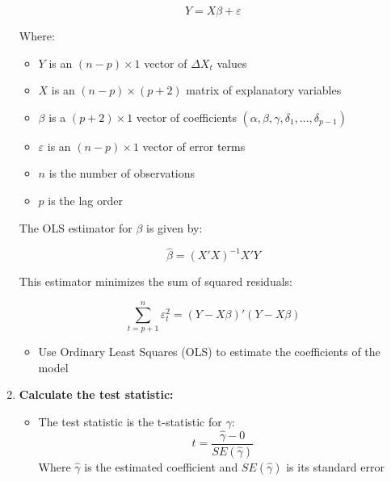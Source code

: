 \documentclass{article}
\begin{document}
\begin{definition}
\begin{enumerate}
        \begin{equation}
        Y = X\beta + \varepsilon
        \end{equation}

        Where:
        \begin{itemize}
            \item $Y$ is an $(n-p) \times 1$ vector of $\Delta X_t$ values
            \item $X$ is an $(n-p) \times (p+2)$ matrix of explanatory variables
            \item $\beta$ is a $(p+2) \times 1$ vector of coefficients $(\alpha, \beta, \gamma, \delta_1, \ldots, \delta_{p-1})$
            \item $\varepsilon$ is an $(n-p) \times 1$ vector of error terms
            \item $n$ is the number of observations
            \item $p$ is the lag order
        \end{itemize}

        The OLS estimator for $\beta$ is given by:

        \begin{equation}
        \hat{\beta} = (X'X)^{-1}X'Y
        \end{equation}

        This estimator minimizes the sum of squared residuals:

        \begin{equation}
        \sum_{t=p+1}^n \varepsilon_t^2 = (Y - X\beta)'(Y - X\beta)
        \end{equation}
        \begin{itemize}
            \item Use Ordinary Least Squares (OLS) to estimate the coefficients of the model
        \end{itemize}

        \item \textbf{Calculate the test statistic:}
        \begin{itemize}
            \item The test statistic is the t-statistic for $\gamma$:
            \begin{equation}
            t = \frac{\hat{\gamma} - 0}{SE(\hat{\gamma})}
            \end{equation}
            Where $\hat{\gamma}$ is the estimated coefficient and $SE(\hat{\gamma})$ is its standard error
        \end{itemize}


\end{enumerate}
\end{definition}
\end{document}
